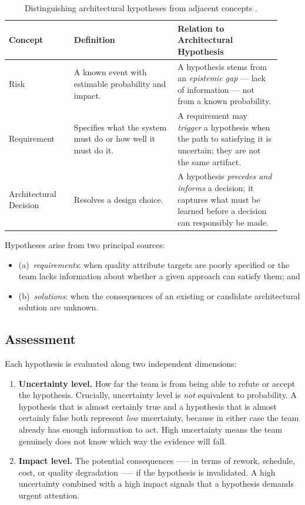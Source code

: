 \begin{table}[htbp]
\centering
\caption{Distinguishing architectural hypotheses from adjacent concepts \citep{silva2024tse}.}
\label{tab:hypothesis-concepts}
\begin{tabular}{p{0.22\linewidth} p{0.35\linewidth} p{0.35\linewidth}}
\toprule
\textbf{Concept} & \textbf{Definition} & \textbf{Relation to Architectural Hypothesis} \\
\midrule
Risk & A known event with estimable probability and impact. & A hypothesis stems from an \emph{epistemic gap} --- lack of information --- not from a known probability. \\
\midrule
Requirement & Specifies what the system must do or how well it must do it. & A requirement may \emph{trigger} a hypothesis when the path to satisfying it is uncertain; they are not the same artifact. \\
\midrule
Architectural Decision & Resolves a design choice. & A hypothesis \emph{precedes and informs} a decision; it captures what must be learned before a decision can responsibly be made. \\
\bottomrule
\end{tabular}
\end{table}

Hypotheses arise from two principal sources:

\begin{itemize}
  \item (a)~\emph{requirements}: when quality attribute targets are poorly specified or the team lacks information about whether a given approach can satisfy them; and 
  \item (b)~\emph{solutions}: when the consequences of an existing or candidate architectural solution are unknown.
\end{itemize}

\subsection{Assessment}
\label{subsec:archhypo-assessment}

Each hypothesis is evaluated along two independent dimensions:

\begin{enumerate}
  \item \textbf{Uncertainty level.} How far the team is from being able to refute or
  accept the hypothesis. Crucially, uncertainty level is \emph{not} equivalent to
  probability. A hypothesis that is almost certainly true and a hypothesis that is almost
  certainly false both represent \emph{low} uncertainty, because in either case the team
  already has enough information to act. High uncertainty means the team genuinely
  does not know which way the evidence will fall.

  \item \textbf{Impact level.} The potential consequences --— in terms of rework,
  schedule, cost, or quality degradation --— if the hypothesis is invalidated. A high
  uncertainty combined with a high impact signals that a hypothesis demands urgent
  attention.
\end{enumerate}

